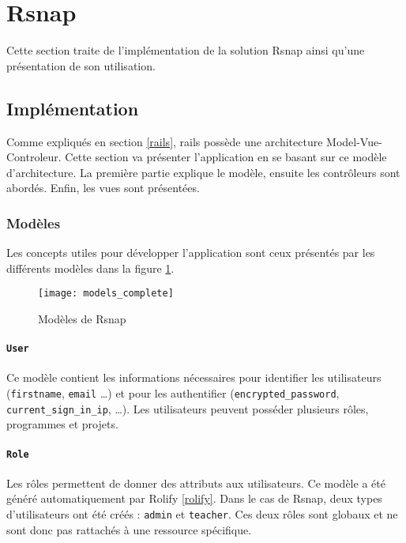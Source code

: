 \section{Rsnap}
\graphicspath{{content/7-solution/3-rsnap/images/}}
Cette section traite de l'implémentation de la solution \gls{Rsnap} ainsi qu'une présentation de son utilisation.

\subsection{Implémentation}
Comme expliqués en section \ref{rails}, \gls{rails} possède une architecture Model-Vue-Controleur. Cette section va présenter l'application en se basant sur ce modèle d'architecture. La première partie explique le modèle, ensuite les contrôleurs sont abordés. Enfin, les vues sont présentées.

\subsubsection{Modèles}
Les concepts utiles pour développer l'application sont ceux présentés par les différents modèles dans la figure \ref{fig:models}.

\begin{figure}
 \begin{center}
   \texttt{[image: models\_complete]}
   \caption{Modèles de Rsnap}
   \label{fig:models}
 \end{center}
\end{figure}

\paragraph{\texttt{User}} Ce modèle contient les informations nécessaires pour identifier les utilisateurs (\texttt{firstname}, \texttt{email} \ldots) et pour les authentifier (\texttt{encrypted\_password}, \texttt{current\_sign\_in\_ip}, \ldots). Les utilisateurs peuvent posséder plusieurs rôles, programmes et projets.

\paragraph{\texttt{Role}} Les rôles permettent de donner des attributs aux utilisateurs. Ce modèle a été généré automatiquement par Rolify \ref{rolify}. Dans le cas de \gls{Rsnap}, deux types d'utilisateurs ont été créés : \texttt{admin} et \texttt{teacher}. Ces deux rôles sont globaux et ne sont donc pas rattachés à une ressource spécifique.

